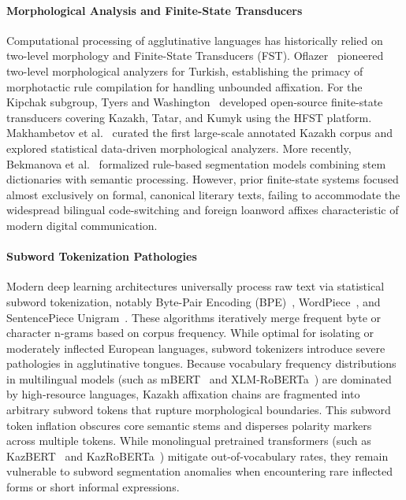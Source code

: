 \paragraph{Morphological Analysis and Finite-State Transducers}
Computational processing of agglutinative languages has historically relied on two-level morphology and Finite-State Transducers (FST). Oflazer~\citep{oflazer1994twolevel} pioneered two-level morphological analyzers for Turkish, establishing the primacy of morphotactic rule compilation for handling unbounded affixation. For the Kipchak subgroup, Tyers and Washington~\citep{tyers2016finite} developed open-source finite-state transducers covering Kazakh, Tatar, and Kumyk using the HFST platform. Makhambetov et al.~\citep{makhambetov2013kazakh,makhambetov2015data} curated the first large-scale annotated Kazakh corpus and explored statistical data-driven morphological analyzers. More recently, Bekmanova et al.~\citep{bekmanova2021kazakh} formalized rule-based segmentation models combining stem dictionaries with semantic processing. However, prior finite-state systems focused almost exclusively on formal, canonical literary texts, failing to accommodate the widespread bilingual code-switching and foreign loanword affixes characteristic of modern digital communication.

\paragraph{Subword Tokenization Pathologies}
Modern deep learning architectures universally process raw text via statistical subword tokenization, notably Byte-Pair Encoding (BPE)~\citep{sennrich2016subword}, WordPiece~\citep{devlin2019bert}, and SentencePiece Unigram~\citep{kudo2018sentencepiece}. These algorithms iteratively merge frequent byte or character n-grams based on corpus frequency. While optimal for isolating or moderately inflected European languages, subword tokenizers introduce severe pathologies in agglutinative tongues. Because vocabulary frequency distributions in multilingual models (such as mBERT~\citep{devlin2019bert} and XLM-RoBERTa~\citep{conneau2020xlmr}) are dominated by high-resource languages, Kazakh affixation chains are fragmented into arbitrary subword tokens that rupture morphological boundaries. This subword token inflation obscures core semantic stems and disperses polarity markers across multiple tokens. While monolingual pretrained transformers (such as KazBERT~\citep{eraly2021kazbert} and KazRoBERTa~\citep{sagyndyk2025kazroberta}) mitigate out-of-vocabulary rates, they remain vulnerable to subword segmentation anomalies when encountering rare inflected forms or short informal expressions.

